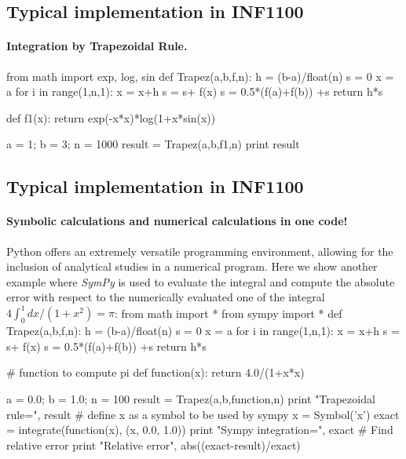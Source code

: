 \documentclass[%
twoside,                 %
final,                   %
10pt]{article}
\begin{document}
\noindent



\subsection{Typical implementation in INF1100}

\paragraph{Integration by Trapezoidal Rule.}

\bpycod
from math import exp, log, sin
def Trapez(a,b,f,n):
   h = (b-a)/float(n)
   s = 0
   x = a
   for i in range(1,n,1):
       x = x+h
       s = s+ f(x)
   s = 0.5*(f(a)+f(b)) +s
   return h*s

def f1(x):
    return exp(-x*x)*log(1+x*sin(x))

a = 1;  b = 3; n = 1000
result = Trapez(a,b,f1,n)
print result
\epycod




\subsection{Typical implementation in INF1100}

\paragraph{Symbolic calculations and numerical calculations in one code!}
Python offers an  extremely versatile programming  environment, allowing for the inclusion of analytical studies in a numerical program. Here we show another example
where \emph{SymPy} is used to evaluate the integral and compute the absolute error 
with respect to the numerically evaluated one of the integral
$4\int_0^1 dx/(1+x^2) = \pi$: 
\bpycod
from math import *
from sympy import *
def Trapez(a,b,f,n):
   h = (b-a)/float(n)
   s = 0
   x = a
   for i in range(1,n,1):
       x = x+h
       s = s+ f(x)
   s = 0.5*(f(a)+f(b)) +s
   return h*s

#  function to compute pi
def function(x):
    return 4.0/(1+x*x)

a = 0.0;  b = 1.0; n = 100
result = Trapez(a,b,function,n)
print "Trapezoidal rule=", result
# define x as a symbol to be used by sympy
x = Symbol('x')
exact = integrate(function(x), (x, 0.0, 1.0))
print "Sympy integration=", exact
# Find relative error
print "Relative error", abs((exact-result)/exact)
\epycod
\end{document}
